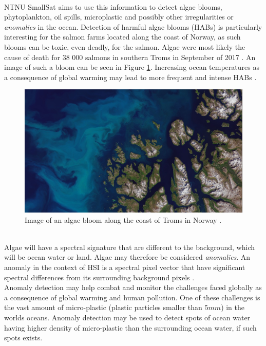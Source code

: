 \\

NTNU SmallSat aims to use this information to detect algae blooms, phytoplankton, oil spills, microplastic and possibly other irregularities or \textit{anomalies} in the ocean. Detection of harmful algae blooms (HABs) is particularly interesting for the salmon farms located along the coast of Norway, as such blooms can be toxic, even deadly, for the salmon. Algae were most likely the cause of death for 38 000 salmons in southern Troms in September of 2017 \cite{laksedeath}. An image of such a bloom can be seen in Figure \ref{fig:algae_bloom_troms}. Increasing ocean temperatures as a consequence of global warming may lead to more frequent and intense HABs \cite{climate_change_algae_blooms}. 
\\

\begin{figure}[H]
\centering
   \includegraphics[scale=0.3]{images/algaes/algaes_northern_troms.jpg}
  \caption{ Image of an algae bloom along the coast of Troms in Norway \cite{laksedeath}.  } 
  \label{fig:algae_bloom_troms}
\end{figure}
\\

Algae will have a spectral signature that are different to the background, which will be ocean water or land. Algae may therefore be considered \textit{anomalies}. An anomaly in the context of HSI is a spectral pixel vector that have significant spectral differences from its surrounding background pixels \cite{yang2015dual}.  
\\

Anomaly detection may help combat and monitor the challenges faced globally as a consequence of global warming and human pollution. One of these challenges is the vast amount of micro-plastic (plastic particles smaller than $5mm$) in the worlds oceans. Anomaly detection may be used to detect spots of ocean water having higher density of micro-plastic than the surrounding ocean water, if such spots exists.       \\



